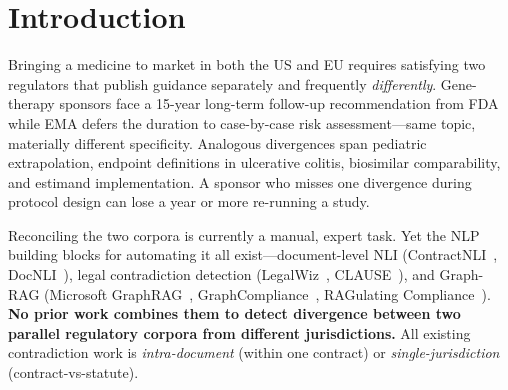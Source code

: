 \documentclass[manuscript]{acmart}
\begin{document}


\maketitle

\section{Introduction}

Bringing a medicine to market in both the US and EU requires satisfying two
regulators that publish guidance separately and frequently \textit{differently}.
Gene-therapy sponsors face a 15-year long-term follow-up recommendation from FDA
while EMA defers the duration to case-by-case risk assessment---same topic,
materially different specificity. Analogous divergences span pediatric
extrapolation, endpoint definitions in ulcerative colitis, biosimilar
comparability, and estimand implementation. A sponsor who misses one divergence
during protocol design can lose a year or more re-running a study.

Reconciling the two corpora is currently a manual, expert task. Yet the NLP
building blocks for automating it all exist---document-level NLI
(ContractNLI~\cite{koreeda2021contractnli}, DocNLI~\cite{yin2021docnli}),
legal contradiction detection (LegalWiz~\cite{legalwiz2025},
CLAUSE~\cite{betterclause2026}), and Graph-RAG (Microsoft
GraphRAG~\cite{edge2024graphrag}, GraphCompliance~\cite{graphcompliance2025},
RAGulating Compliance~\cite{ragulating2025}). \textbf{No prior work combines
them to detect divergence between two parallel regulatory corpora from different
jurisdictions.} All existing contradiction work is \textit{intra-document}
(within one contract) or \textit{single-jurisdiction} (contract-vs-statute).
\end{document}
